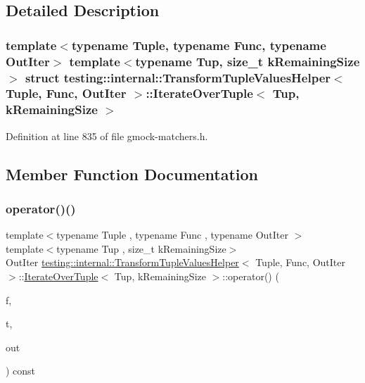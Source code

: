 \subsection{Detailed Description}
\subsubsection*{template$<$typename Tuple, typename Func, typename Out\+Iter$>$\newline
template$<$typename Tup, size\+\_\+t k\+Remaining\+Size$>$\newline
struct testing\+::internal\+::\+Transform\+Tuple\+Values\+Helper$<$ Tuple, Func, Out\+Iter $>$\+::\+Iterate\+Over\+Tuple$<$ Tup, k\+Remaining\+Size $>$}



Definition at line 835 of file gmock-\/matchers.\+h.



\subsection{Member Function Documentation}
\mbox{\label{structtesting_1_1internal_1_1TransformTupleValuesHelper_1_1IterateOverTuple_a2ce58379c68390ce846d6e7de1457411}} 
\subsubsection{\texorpdfstring{operator()()}{operator()()}}
{\footnotesize\ttfamily template$<$typename Tuple , typename Func , typename Out\+Iter $>$ \\
template$<$typename Tup , size\+\_\+t k\+Remaining\+Size$>$ \\
Out\+Iter \hyperlink{classtesting_1_1internal_1_1TransformTupleValuesHelper}{testing\+::internal\+::\+Transform\+Tuple\+Values\+Helper}$<$ Tuple, Func, Out\+Iter $>$\+::\hyperlink{structtesting_1_1internal_1_1TransformTupleValuesHelper_1_1IterateOverTuple}{Iterate\+Over\+Tuple}$<$ Tup, k\+Remaining\+Size $>$\+::operator() (\begin{DoxyParamCaption}\item[{Func}]{f,  }\item[{const Tup \&}]{t,  }\item[{Out\+Iter}]{out }\end{DoxyParamCaption}) const\hspace{0.3cm}{\ttfamily [inline]}}



